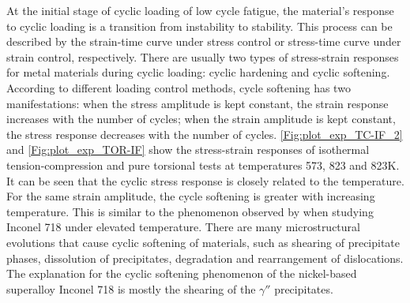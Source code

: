 
At the initial stage of cyclic loading of low cycle fatigue, the material's response to cyclic loading is a transition from instability to stability.
This process can be described by the strain-time curve under stress control or stress-time curve under strain control, respectively.
There are usually two types of stress-strain responses for metal materials during cyclic loading: cyclic hardening and cyclic softening.
According to different loading control methods, cycle softening has two manifestations: when the stress amplitude is kept constant, the strain response increases with the number of cycles; when the strain amplitude is kept constant, the stress response decreases with the number of cycles.
\ref{Fig:plot_exp_TC-IF_2} and \ref{Fig:plot_exp_TOR-IF} show the stress-strain responses of isothermal tension-compression and pure torsional tests at temperatures 573, 823 and 823K. It can be seen that the cyclic stress response is closely related to the temperature. For the same strain amplitude, the cycle softening is greater with increasing temperature. This is similar to the phenomenon observed by \cite{Fournier1977,Xiao2005,kim1988elevated,Schlesinger2017} when studying Inconel 718 under elevated temperature.
There are many microstructural evolutions that cause cyclic softening of materials, such as shearing of precipitate phases, dissolution of precipitates, degradation and rearrangement of dislocations.
The explanation for the cyclic softening phenomenon of the nickel-based superalloy Inconel 718 is mostly the shearing of the $\gamma ''$ precipitates.

